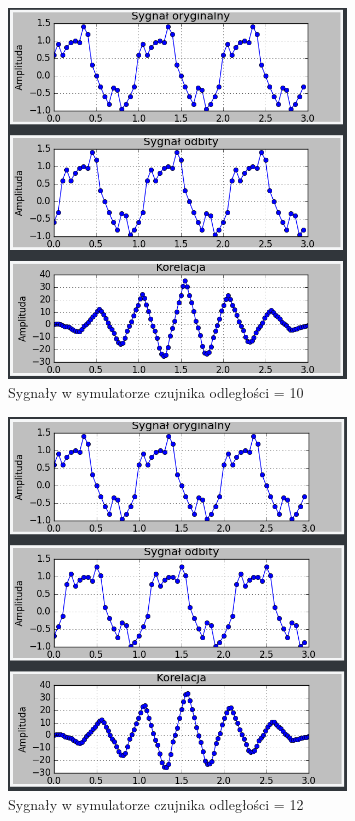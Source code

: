 \documentclass{article}
\begin{document}
{{\begin{figure}[h!]
                \includegraphics[width=0.8\textwidth]{img/sim2.png}
                \caption{Sygnały w symulatorze czujnika odległości = 10}
            \end{figure}
            \begin{figure}[h!]
                \centering
                \includegraphics[width=0.8\textwidth]{img/sim3.png}
                \caption{Sygnały w symulatorze czujnika odległości = 12}
            \end{figure}
}}
\end{document}
